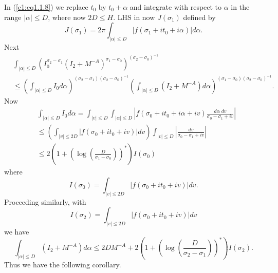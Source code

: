 In (\ref{c1:eq1.1.8}) we replace $t_0$ by $t_0 + \alpha$ and integrate with respect to $\alpha$ in the range $|\alpha| \leq D$, where now $2D \leq H$. LHS in now $J(\sigma_1)$ defined by
\begin{equation*}
J(\sigma_1) = 2\pi \int_{|\alpha| \leq D} |f(\sigma_1 + it_0 + i\alpha )| d \alpha.
\tag{1.1.11}\label{c1:eq1.1.11}
\end{equation*}
Next
\begin{align*}
& \int_{|\alpha| \leq D} \left(I^{\sigma_2 - \sigma_1}_0 (I_2 + M^{-A})^{\sigma_1 - \sigma_0} \right)^{(\sigma_2 - \sigma_0)^{-1}} \\
& \leq \left(\int_{|\alpha| \leq D} I_0 d\alpha \right)^{(\sigma_2-\sigma_1) (\sigma_2 - \sigma_0)^{-1}}  \left(\int_{|\alpha| \leq D} (I_2 + M^{-A})d\alpha \right)^{(\sigma_1 - \sigma_0) (\sigma_2 - \sigma_0)^{-1}}. 
\end{align*}
Now
\begin{align*}
& \int_{|\alpha|\leq D} I_0 d\alpha = \int_{|v| \leq D} \int_{|\alpha| \leq D} \left|f(\sigma_0 + it_0 + i \alpha + iv)  \frac{d\alpha \; dv}{\sigma_0 - \sigma_1 + iv}\right|\\
& \leq \left(\int_{|v| \leq 2D} |f(\sigma_0 + it_0 + iv)|dv \right) \int_{|v|\leq D} \left|\frac{dv}{\sigma_0 - \sigma_1 + iv} \right|\\
& \leq 2 \left(1+ \left(\log \left(\frac{D}{\sigma_1 - \sigma_0} \right) \right)^* \right) I(\sigma_0) \tag{1.1.12} \label{c1:eq1.1.12}
\end{align*}
where\pageoriginale
\begin{equation*}
I(\sigma_0) = \int_{|v| \leq 2D} |f(\sigma_0 + it_0 + iv)| dv. \tag{1.1.13}\label{c1:eq1.1.13}
\end{equation*}
Proceeding similarly, with
\begin{equation*}
I(\sigma_2)  = \int_{|v| \leq 2D} |f(\sigma_0 + it_0+iv)| dv \tag{1.1.14}\label{c1:eq1.1.14}
\end{equation*}
we have 
\begin{equation*}
\int_{|\alpha| \leq D} (I_2 + M^{-A}) d \alpha \leq 2 D M^{-A} + 2 \left(1+ \left(\log \left( \frac{D}{\sigma_2 - \sigma_1}\right) \right)^*\right) I(\sigma_2). \tag{1.1.15}\label{c1:eq1.1.15}
\end{equation*}
Thus we have the following corollary.


